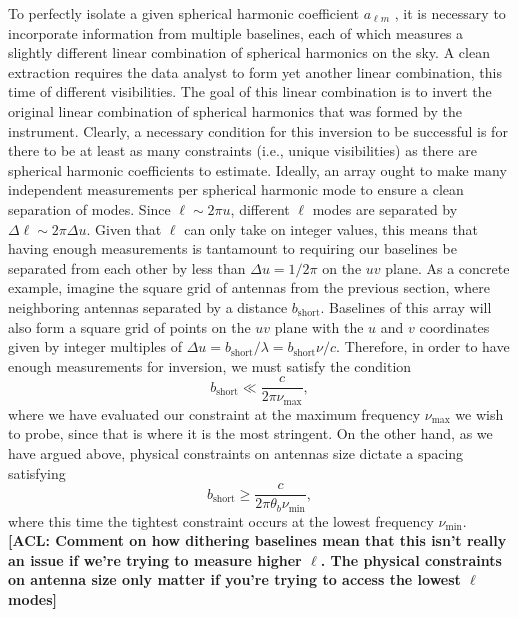 \documentclass[twolcolumn,apj,iop,numberedappendix]{emulateapj}
\newcommand{\acl}[1]{{\color{red} \textbf{[ACL:  #1]}}}
\begin{document}
To perfectly isolate a given spherical harmonic coefficient $a_{\ell m}$ , it is necessary to incorporate information from multiple baselines, each of which measures a slightly different linear combination of spherical harmonics on the sky. A clean extraction requires the data analyst to form yet another linear combination, this time of different visibilities. The goal of this linear combination is to invert the original linear combination of spherical harmonics that was formed by the instrument. Clearly, a necessary condition for this inversion to be successful is for there to be at least as many constraints (i.e., unique visibilities) as there are spherical harmonic coefficients to estimate. Ideally, an array ought to make many independent measurements per spherical harmonic mode to ensure a clean separation of modes.  Since $\ell \sim 2 \pi u$, different $\ell$ modes are separated by $\Delta \ell \sim 2 \pi \Delta u$.  Given that $\ell$ can only take on integer values, this means that having enough measurements is tantamount to requiring our baselines be separated from each other by less than $\Delta u = 1/ 2 \pi$ on the $uv$ plane.  As a concrete example, imagine the square grid of antennas from the previous section, where neighboring antennas separated by a distance $b_\textrm{short}$.  Baselines of this array will also form a square grid of points on the $uv$ plane with the $u$ and $v$ coordinates given by integer multiples of $\Delta u = b_\textrm{short} / \lambda = b_\textrm{short} \nu / c$.  Therefore, in order to have enough measurements for inversion, we must satisfy the condition
\begin{equation}
\label{eq:WantAll}
b_\textrm{short} \ll \frac{c}{2 \pi \nu_\textrm{max}},
\end{equation}
where we have evaluated our constraint at the maximum frequency $\nu_\textrm{max}$ we wish to probe, since that is where it is the most stringent.  On the other hand, as we have argued above, physical constraints on antennas size dictate a spacing satisfying
\begin{equation}
\label{eq:AntSize}
b_\textrm{short} \ge \frac{c}{2 \pi \theta_b \nu_\textrm{min}},
\end{equation}
where this time the tightest constraint occurs at the lowest frequency $\nu_\textrm{min}$. \acl{Comment on how dithering baselines mean that this isn't really an issue if we're trying to measure higher $\ell$. The physical constraints on antenna size only matter if you're trying to access the lowest $\ell$ modes}
\end{document}
